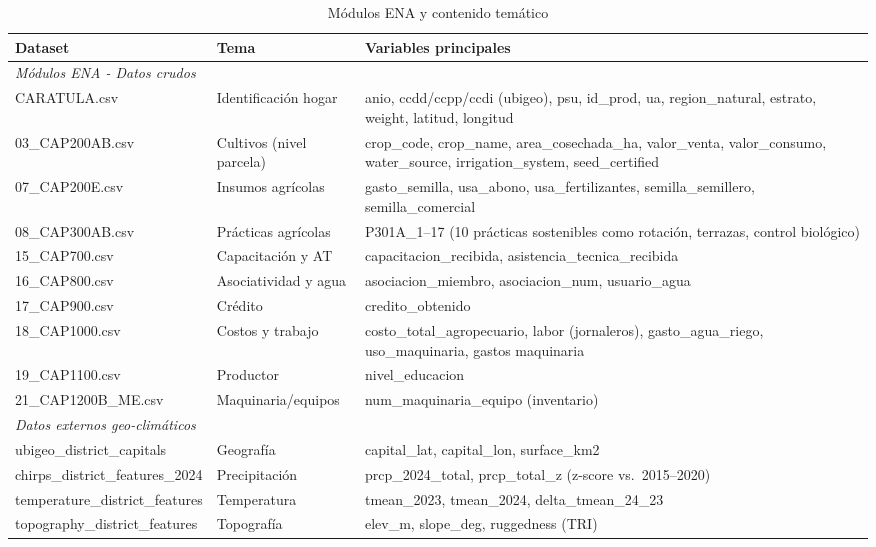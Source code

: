 \documentclass[11pt,a4paper]{article}
\begin{document}
\begin{table}[H]
\centering
\caption{Módulos ENA y contenido temático}
\label{tab:module_topics}
\begin{threeparttable}
\footnotesize
\begin{tabular}{p{3.5cm}p{3cm}p{6.5cm}}
\toprule
\textbf{Dataset} & \textbf{Tema} & \textbf{Variables principales} \\
\midrule
\multicolumn{3}{l}{\textit{Módulos ENA - Datos crudos}} \\
CARATULA.csv & Identificación hogar & anio, ccdd/ccpp/ccdi (ubigeo), psu, id\_prod, ua, region\_natural, estrato, weight, latitud, longitud \\
03\_CAP200AB.csv & Cultivos (nivel parcela) & crop\_code, crop\_name, area\_cosechada\_ha, valor\_venta, valor\_consumo, water\_source, irrigation\_system, seed\_certified \\
07\_CAP200E.csv & Insumos agrícolas & gasto\_semilla, usa\_abono, usa\_fertilizantes, semilla\_semillero, semilla\_comercial \\
08\_CAP300AB.csv & Prácticas agrícolas & P301A\_1--17 (10 prácticas sostenibles como rotación, terrazas, control biológico) \\
15\_CAP700.csv & Capacitación y AT & capacitacion\_recibida, asistencia\_tecnica\_recibida \\
16\_CAP800.csv & Asociatividad y agua & asociacion\_miembro, asociacion\_num, usuario\_agua \\
17\_CAP900.csv & Crédito & credito\_obtenido \\
18\_CAP1000.csv & Costos y trabajo & costo\_total\_agropecuario, labor (jornaleros), gasto\_agua\_riego, uso\_maquinaria, gastos maquinaria \\
19\_CAP1100.csv & Productor & nivel\_educacion \\
21\_CAP1200B\_ME.csv & Maquinaria/equipos & num\_maquinaria\_equipo (inventario) \\
\midrule
\multicolumn{3}{l}{\textit{Datos externos geo-climáticos}} \\
ubigeo\_district\_capitals & Geografía & capital\_lat, capital\_lon, surface\_km2 \\
chirps\_district\_features\_2024 & Precipitación & prcp\_2024\_total, prcp\_total\_z (z-score vs.\ 2015--2020) \\
temperature\_district\_features & Temperatura & tmean\_2023, tmean\_2024, delta\_tmean\_24\_23 \\
topography\_district\_features & Topografía & elev\_m, slope\_deg, ruggedness (TRI) \\
\bottomrule
\end{tabular}
\end{threeparttable}
\end{table}
\end{document}
